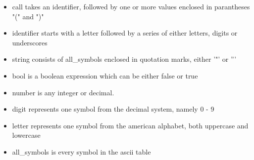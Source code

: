 \begin{itemize}
\item call takes an identifier, followed by one or more values enclosed in parantheses "(" and ")"

\item identifier starts with a letter followed by a series of either letters, digits or underscores

\item string consists of all\_symbols enclosed in quotation marks, either '"' or '''

\item bool is a boolean expression which can be either false or true

\item number is any integer or decimal.

\item digit represents one symbol from the decimal system, namely 0 - 9

\item letter represents one symbol from the american alphabet, both uppercase and lowercase

\item all\_symbols is every symbol in the ascii table

\end{itemize}